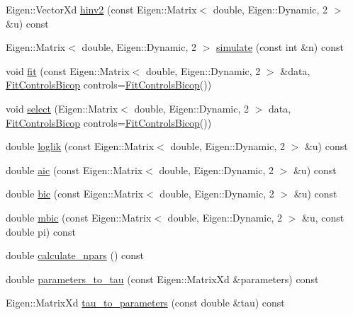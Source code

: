 \begin{DoxyCompactItemize}
\item 
Eigen\+::\+Vector\+Xd \hyperlink{classvinecopulib_1_1_bicop_a52c8d47c7ccf77f69c1c6902856c0e35}{hinv2} (const Eigen\+::\+Matrix$<$ double, Eigen\+::\+Dynamic, 2 $>$ \&u) const 
\item 
Eigen\+::\+Matrix$<$ double, Eigen\+::\+Dynamic, 2 $>$ \hyperlink{classvinecopulib_1_1_bicop_a79e63e141e636908fe6727d5bed222a3}{simulate} (const int \&n) const 
\item 
void \hyperlink{classvinecopulib_1_1_bicop_a2d509a8b404a73ef17f04a0678e90a71}{fit} (const Eigen\+::\+Matrix$<$ double, Eigen\+::\+Dynamic, 2 $>$ \&data, \hyperlink{classvinecopulib_1_1_fit_controls_bicop}{Fit\+Controls\+Bicop} controls=\hyperlink{classvinecopulib_1_1_fit_controls_bicop}{Fit\+Controls\+Bicop}())
\item 
void \hyperlink{classvinecopulib_1_1_bicop_af20af5c3ba6565628987b4784e9ac348}{select} (Eigen\+::\+Matrix$<$ double, Eigen\+::\+Dynamic, 2 $>$ data, \hyperlink{classvinecopulib_1_1_fit_controls_bicop}{Fit\+Controls\+Bicop} controls=\hyperlink{classvinecopulib_1_1_fit_controls_bicop}{Fit\+Controls\+Bicop}())
\item 
double \hyperlink{classvinecopulib_1_1_bicop_ad1ee397f2273ed07ba1d5d2ebff7ef1f}{loglik} (const Eigen\+::\+Matrix$<$ double, Eigen\+::\+Dynamic, 2 $>$ \&u) const 
\item 
double \hyperlink{classvinecopulib_1_1_bicop_afa2b49c6c6da183f8cb365981d4d559c}{aic} (const Eigen\+::\+Matrix$<$ double, Eigen\+::\+Dynamic, 2 $>$ \&u) const 
\item 
double \hyperlink{classvinecopulib_1_1_bicop_a5935f84a33d80dbe7cbc6d071a1e8d75}{bic} (const Eigen\+::\+Matrix$<$ double, Eigen\+::\+Dynamic, 2 $>$ \&u) const 
\item 
double \hyperlink{classvinecopulib_1_1_bicop_a8c2c27bc6d39cc970b739b0b40f4bcad}{mbic} (const Eigen\+::\+Matrix$<$ double, Eigen\+::\+Dynamic, 2 $>$ \&u, const double pi) const 
\item 
double \hyperlink{classvinecopulib_1_1_bicop_a6fbc58e9d4cd565e805347083cbcc63d}{calculate\+\_\+npars} () const 
\item 
double \hyperlink{classvinecopulib_1_1_bicop_ac244ca18350854951708a360e5e508ed}{parameters\+\_\+to\+\_\+tau} (const Eigen\+::\+Matrix\+Xd \&parameters) const 
\item 
Eigen\+::\+Matrix\+Xd \hyperlink{classvinecopulib_1_1_bicop_afd2d6a3ae7349d06f79a3c2e5877c17e}{tau\+\_\+to\+\_\+parameters} (const double \&tau) const 
\end{DoxyCompactItemize}
